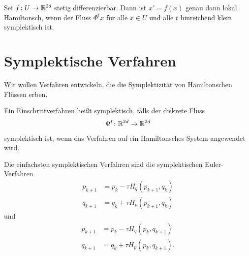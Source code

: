 \begin{satz}
	Sei $f \colon U \to \mathbb R^{2d}$ stetig differenzierbar.
	Dann ist $x' = f(x)$ genau dann lokal Hamiltonsch, wenn der Fluss $\Phi^t x$ für alle $x \in U$ und alle $t$ hinreichend klein symplektisch ist.
\end{satz}




\section{Symplektische Verfahren}

Wir wollen Verfahren entwickeln, die die Symplektizität von Hamiltonschen Flüssen erben.

\begin{definition}
	Ein Einschrittverfahren heißt symplektisch, falls der diskrete Fluss
	\begin{equation*}
		\Psi^t \colon \mathbb R^{2d}\to\mathbb R^{2d}
	\end{equation*}
	symplektisch ist, wenn das Verfahren auf ein Hamiltonsches System angewendet wird.
\end{definition}

Die einfachsten symplektischen Verfahren sind die symplektischen Euler-Verfahren
\begin{align*}
	p_{k+1} &= p_k - \tau H_q(p_{k+1},q_k) \\
	q_{k+1} &= q_k + \tau H_p(p_{k+1},q_k)
\end{align*}
und
\begin{align*}
	p_{k+1} &= p_k - \tau H_q(p_k,q_{k+1}) \\
	q_{k+1} &= q_k + \tau H_p(p_k,q_{k+1}).
\end{align*}

